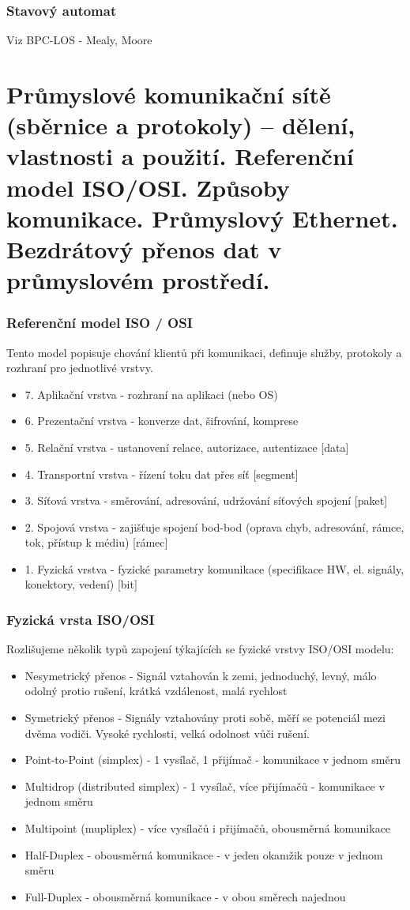 \subsubsection*{Stavový automat}
Viz BPC-LOS - Mealy, Moore

\section{Průmyslové komunikační sítě (sběrnice a protokoly) – dělení, vlastnosti a použití. Referenční model ISO/OSI. Způsoby komunikace. Průmyslový Ethernet. Bezdrátový přenos dat v průmyslovém prostředí.}
\subsubsection*{Referenční model ISO / OSI}
Tento model popisuje chování klientů při komunikaci, definuje služby, protokoly a rozhraní pro jednotlivé vrstvy.
\begin{itemize}
    \item 7. Aplikační vrstva - rozhraní na aplikaci (nebo OS)
    \item 6. Prezentační vrstva - konverze dat, šifrování, komprese
    \item 5. Relační vrstva - ustanovení relace, autorizace, autentizace [data]
    \item 4. Transportní vrstva - řízení toku dat přes síť [segment]
    \item 3. Síťová vrstva - směrování, adresování, udržování síťových spojení [paket]
    \item 2. Spojová vrstva - zajišťuje spojení bod-bod (oprava chyb, adresování, rámce, tok, přístup k médiu) [rámec]
    \item 1. Fyzická vrstva - fyzické parametry komunikace (specifikace HW, el. signály, konektory, vedení) [bit]
\end{itemize}

\subsubsection*{Fyzická vrsta ISO/OSI}
Rozlišujeme několik typů zapojení týkajících se fyzické vrstvy ISO/OSI modelu:
\begin{itemize}
    \item Nesymetrický přenos - Signál vztahován k zemi, jednoduchý, levný, málo odolný protio rušení, krátká vzdálenost, malá rychlost
    \item Symetrický přenos - Signály vztahovány proti sobě, měří se potenciál mezi dvěma vodiči. Vysoké rychlosti, velká odolnost vůči rušení.
    \item Point-to-Point (simplex) - 1 vysílač, 1 přijímač - komunikace v jednom směru
    \item Multidrop (distributed simplex) - 1 vysílač, více přijímačů - komunikace v jednom směru
    \item Multipoint (mupliplex) - více vysílačů i přijímačů, obousměrná komunikace
    \item Half-Duplex - obousměrná komunikace - v jeden okamžik pouze v jednom směru
    \item Full-Duplex - obousměrná komunikace - v obou směrech najednou
\end{itemize}

